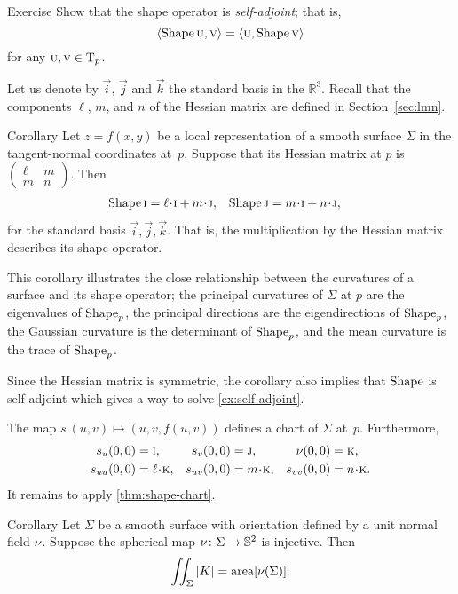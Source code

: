 \begin{thm}{Exercise}\label{ex:self-adjoint}
Show that the shape operator is \emph{self-adjoint}; that is,
\[\langle \mathop{\rm Shape}\nolimits\text{\sc{u}},\text{\sc{v}}\rangle=\langle \text{\sc{u}},\mathop{\rm Shape}\nolimits\text{\sc{v}}\rangle\]
for any $\text{\sc{u}},\text{\sc{v}}\in\mathrm{T}_p$.
\end{thm}

Let us denote by $\vec i$, $\vec j$ and $\vec k$ the standard basis in the $\mathbb{R}^3$.
Recall that the components $\ell$, $m$, and $n$ of the Hessian matrix are defined in Section~\ref{sec:lmn}.

\begin{thm}{Corollary}\label{cor:Shape(ij)}
Let $z=f(x,y)$ be a local representation of a smooth surface $\Sigma$ in the tangent-normal coordinates at~$p$.
Suppose that its Hessian matrix at $p$ is $(\begin{smallmatrix}
\ell&m\\ m&n
\end{smallmatrix})$.
Then 
\begin{align*}
\Shape\vec i&=\ell\cdot \vec i+m\cdot \vec j,
&
\Shape\vec j&=m\cdot \vec i+n\cdot\vec j,
\end{align*}
for the standard basis $\vec i,\vec j,\vec k$.
That is, the multiplication by the Hessian matrix describes its shape operator.
\end{thm}


This corollary illustrates the close relationship between the curvatures of a surface and its shape operator; the principal curvatures of $\Sigma$ at $p$ are the eigenvalues of $\mathop{\rm Shape}\nolimits_p$, the principal directions are the eigendirections of $\mathop{\rm Shape}\nolimits_p$, the Gaussian curvature is the determinant of $\mathop{\rm Shape}\nolimits_p$, and the mean curvature is the trace of $\mathop{\rm Shape}\nolimits_p$.


Since the Hessian matrix is symmetric, the corollary also implies that $\mathop{\rm Shape}\nolimits$ is self-adjoint which gives a way to solve \ref{ex:self-adjoint}.

The map $s\:(u,v)\mapsto (u,v,f(u,v))$ defines a chart of $\Sigma$ at~$p$.
Furthermore, 
\begin{align*}
s_u(0,0)&=\vec i,
&
s_v(0,0)&=\vec j,
&
\Norm(0,0)&=\vec k,
\\
s_{uu}(0,0)&=\ell\cdot \vec k,
&
s_{uv}(0,0)&=m\cdot \vec k,
&
s_{vv}(0,0)&=n\cdot \vec k.
\end{align*}
It remains to apply \ref{thm:shape-chart}.
\qeds

\begin{thm}{Corollary}\label{cor:intK}
Let $\Sigma$ be a smooth surface with orientation defined by a unit normal field $\nu$.
Suppose the spherical map $\nu\colon\Sigma\to\mathbb{S}^2$ is injective.
Then 
\[\iint_\Sigma|K|=\mathop{\rm area}\nolimits[\nu(\Sigma)].\]
\end{thm}

